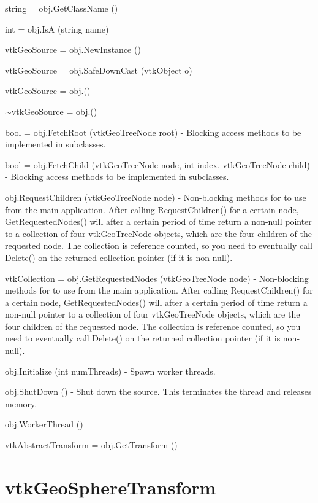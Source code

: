 \begin{DoxyItemize}
\item {\ttfamily string = obj.\-Get\-Class\-Name ()}  
\item {\ttfamily int = obj.\-Is\-A (string name)}  
\item {\ttfamily vtk\-Geo\-Source = obj.\-New\-Instance ()}  
\item {\ttfamily vtk\-Geo\-Source = obj.\-Safe\-Down\-Cast (vtk\-Object o)}  
\item {\ttfamily vtk\-Geo\-Source = obj.()}  
\item {\ttfamily $\sim$vtk\-Geo\-Source = obj.()}  
\item {\ttfamily bool = obj.\-Fetch\-Root (vtk\-Geo\-Tree\-Node root)} -\/ Blocking access methods to be implemented in subclasses.  
\item {\ttfamily bool = obj.\-Fetch\-Child (vtk\-Geo\-Tree\-Node node, int index, vtk\-Geo\-Tree\-Node child)} -\/ Blocking access methods to be implemented in subclasses.  
\item {\ttfamily obj.\-Request\-Children (vtk\-Geo\-Tree\-Node node)} -\/ Non-\/blocking methods for to use from the main application. After calling Request\-Children() for a certain node, Get\-Requested\-Nodes() will after a certain period of time return a non-\/null pointer to a collection of four vtk\-Geo\-Tree\-Node objects, which are the four children of the requested node. The collection is reference counted, so you need to eventually call Delete() on the returned collection pointer (if it is non-\/null).  
\item {\ttfamily vtk\-Collection = obj.\-Get\-Requested\-Nodes (vtk\-Geo\-Tree\-Node node)} -\/ Non-\/blocking methods for to use from the main application. After calling Request\-Children() for a certain node, Get\-Requested\-Nodes() will after a certain period of time return a non-\/null pointer to a collection of four vtk\-Geo\-Tree\-Node objects, which are the four children of the requested node. The collection is reference counted, so you need to eventually call Delete() on the returned collection pointer (if it is non-\/null).  
\item {\ttfamily obj.\-Initialize (int num\-Threads)} -\/ Spawn worker threads.  
\item {\ttfamily obj.\-Shut\-Down ()} -\/ Shut down the source. This terminates the thread and releases memory.  
\item {\ttfamily obj.\-Worker\-Thread ()}  
\item {\ttfamily vtk\-Abstract\-Transform = obj.\-Get\-Transform ()}  
\end{DoxyItemize}\hypertarget{vtkgeovis_vtkgeospheretransform}{}\section{vtk\-Geo\-Sphere\-Transform}\label{vtkgeovis_vtkgeospheretransform}
